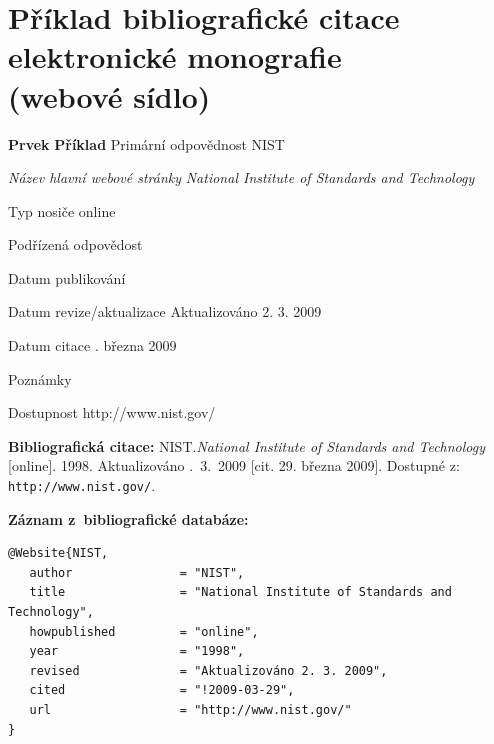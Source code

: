 
\newpage
\section*{Příklad bibliografické citace elektronické monografie \\
(webové sídlo)}
\label{pr-website}
\begin{tabbing}
\zarazky
\textbf{Prvek} \> \textbf{Příklad} \odradkovani
Primární odpovědnost \>
NIST

\odradkovani
{\em Název hlavní webové stránky} \>
{\em National Institute of Standards and Technology}

\odradkovani
Typ nosiče \>
online

\odradkovani
Podřízená odpovědost\footnotemark[1] \>

\odradkovani
Datum publikování 

\odradkovani
Datum revize/aktualizace \>
Aktualizováno 2. 3. 2009

\odradkovani
Datum citace . března 2009

\odradkovani
Poznámky\footnotemark[2] \>

\odradkovani
Dostupnost \>
http://www.nist.gov/

\odradkovani
\end{tabbing}

\noindent \textbf{Bibliografická citace:} \odradkovani
NIST.{\em National Institute of Standards and Technology} [online]. 1998. Aktualizováno .~3.~2009 [cit. 29. března 2009]. Dostupné z: {\tt http://www.nist.gov/}.

\bigskip \bigskip
\noindent \textbf{Záznam z~bibliografické databáze:}
\vspace{-0.5em}
\begin{verbatim}
@Website{NIST,
   author               = "NIST",
   title                = "National Institute of Standards and Technology",
   howpublished         = "online",
   year                 = "1998",
   revised              = "Aktualizováno 2. 3. 2009",
   cited                = "!2009-03-29",
   url                  = "http://www.nist.gov/"
}
\end{verbatim}


